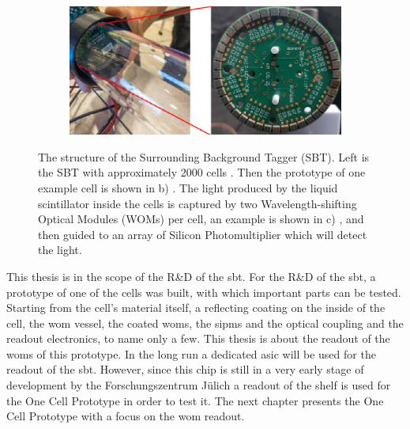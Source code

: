 \begin{figure}
\begin{subfigure}[b]{0.24\textwidth}
		\caption{}
		\label{fig:sbt_structure_cell}
	\end{subfigure}
	\begin{subfigure}[b]{0.42\textwidth}
		\centering
		\includegraphics[width=1.\textwidth]{pictures/sbt_structure_wom}
		\caption{}
		\label{fig:sbt_structure}
	\end{subfigure}
	\caption[Overview of the Surrounding Background Tagger]{The structure of the Surrounding Background Tagger (SBT). Left is the SBT with approximately 2000 cells \cite{Ahdida:2704147}. Then the prototype of one example cell is shown in b) \cite{fairhurst}. The light produced by the liquid scintillator inside the cells is captured by two Wavelength-shifting Optical Modules (WOMs) per cell, an example is shown in c) \cite{}, and then guided to an array of Silicon Photomultiplier which will detect the light.}
 	\label{fig:sbt}
\end{figure}

This thesis is in the scope of the R\&D of the \ac{sbt}.
For the R\&D of the \ac{sbt}, a prototype of one of the cells was built, with which important parts can be tested.
Starting from the cell's material itself, a reflecting coating on the inside of the cell, the \ac{wom} vessel, the coated \acp{wom}, the \acp{sipm} and the optical coupling and the readout electronics, to name only a few.
This thesis is about the readout of the \acp{wom} of this prototype.
In the long run a dedicated \ac{asic} will be used for the readout of the \ac{sbt}.
However, since this chip is still in a very early stage of development by the Forschungszentrum Jülich a readout of the shelf is used for the One Cell Prototype in order to test it.
The next chapter presents the One Cell Prototype with a focus on the \ac{wom} readout.
